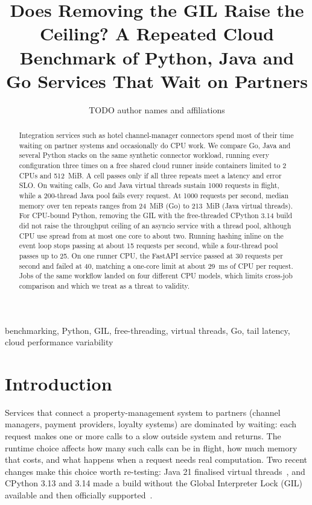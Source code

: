 \documentclass[journal]{IEEEtran}
\begin{document}
\title{Does Removing the GIL Raise the Ceiling? A Repeated Cloud Benchmark of Python, Java and Go Services That Wait on Partners}
\author{TODO author names and affiliations}
\maketitle

\begin{abstract}
Integration services such as hotel channel-manager connectors spend most of their time waiting on partner systems and occasionally do CPU work. We compare Go, Java and several Python stacks on the same synthetic connector workload, running every configuration three times on a free shared cloud runner inside containers limited to 2 CPUs and 512~MiB. A cell passes only if all three repeats meet a latency and error SLO. On waiting calls, Go and Java virtual threads sustain 1000 requests in flight, while a 200-thread Java pool fails every request. At 1000 requests per second, median memory over ten repeats ranges from 24~MiB (Go) to 213~MiB (Java virtual threads). For CPU-bound Python, removing the GIL with the free-threaded CPython 3.14 build did not raise the throughput ceiling of an asyncio service with a thread pool, although CPU use spread from at most one core to about two. Running hashing inline on the event loop stops passing at about 15 requests per second, while a four-thread pool passes up to 25. On one runner CPU, the FastAPI service passed at 30 requests per second and failed at 40, matching a one-core limit at about 29~ms of CPU per request. Jobs of the same workflow landed on four different CPU models, which limits cross-job comparison and which we treat as a threat to validity.
\end{abstract}

\begin{IEEEkeywords}
benchmarking, Python, GIL, free-threading, virtual threads, Go, tail latency, cloud performance variability
\end{IEEEkeywords}

\section{Introduction}
Services that connect a property-management system to partners (channel managers, payment providers, loyalty systems) are dominated by waiting: each request makes one or more calls to a slow outside system and returns. The runtime choice affects how many such calls can be in flight, how much memory that costs, and what happens when a request needs real computation. Two recent changes make this choice worth re-testing: Java 21 finalised virtual threads~\cite{jep444}, and CPython 3.13 and 3.14 made a build without the Global Interpreter Lock (GIL) available and then officially supported~\cite{pep703,pep779}.
\end{document}
